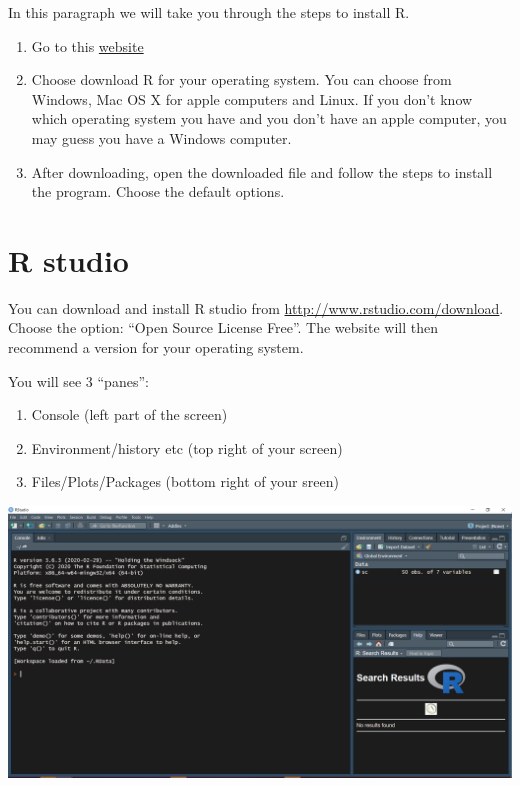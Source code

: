 \documentclass[
]{book}
\providecommand{\tightlist}{%
  \setlength{\itemsep}{0pt}\setlength{\parskip}{0pt}}
\begin{document}
In this paragraph we will take you through the steps to install R.

\begin{enumerate}
\def\labelenumi{\arabic{enumi}.}
\tightlist
\item
  Go to this \href{https://mirror.lyrahosting.com/CRAN/}{website}
\item
  Choose download R for your operating system. You can choose from Windows, Mac OS X for apple computers and Linux. If you don't know which operating system you have and you don't have an apple computer, you may guess you have a Windows computer.
\item
  After downloading, open the downloaded file and follow the steps to install the program. Choose the default options.
\end{enumerate}

\hypertarget{r-studio}{%
\section{R studio}\label{r-studio}}

You can download and install R studio from \url{http://www.rstudio.com/download}. Choose the option: ``Open Source License Free''. The website will then recommend a version for your operating system.

You will see 3 ``panes'':

\begin{enumerate}
\def\labelenumi{\arabic{enumi}.}
\tightlist
\item
  Console (left part of the screen)
\item
  Environment/history etc (top right of your screen)
\item
  Files/Plots/Packages (bottom right of your sreen)
\end{enumerate}

\includegraphics{Rstudio.PNG}
\end{document}
